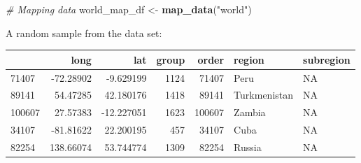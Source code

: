 \documentclass[]{book}
\newenvironment{Shaded}{\begin{snugshade}}{\end{snugshade}}
\newcommand{\KeywordTok}[1]{\textcolor[rgb]{0.13,0.29,0.53}{\textbf{#1}}}
\newcommand{\StringTok}[1]{\textcolor[rgb]{0.31,0.60,0.02}{#1}}
\newcommand{\CommentTok}[1]{\textcolor[rgb]{0.56,0.35,0.01}{\textit{#1}}}
\newcommand{\NormalTok}[1]{#1}
\theoremstyle{definition}
\theoremstyle{definition}
\theoremstyle{definition}
\theoremstyle{remark}
\begin{document}
\begin{Shaded}
\begin{Highlighting}[]
\CommentTok{# Mapping data}
\NormalTok{world_map_df <-}\StringTok{ }\KeywordTok{map_data}\NormalTok{(}\StringTok{"world"}\NormalTok{)}
\end{Highlighting}
\end{Shaded}

A random sample from the data set:

\begin{tabular}{l|r|r|r|r|l|l}
\hline
  & long & lat & group & order & region & subregion\\
\hline
71407 & -72.28902 & -9.629199 & 1124 & 71407 & Peru & NA\\
\hline
89141 & 54.47285 & 42.180176 & 1418 & 89141 & Turkmenistan & NA\\
\hline
100607 & 27.57383 & -12.227051 & 1623 & 100607 & Zambia & NA\\
\hline
34107 & -81.81622 & 22.200195 & 457 & 34107 & Cuba & NA\\
\hline
82254 & 138.66074 & 53.744774 & 1309 & 82254 & Russia & NA\\
\hline
\end{tabular}
\end{document}

